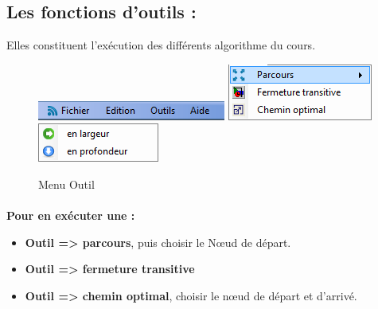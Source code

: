 \documentclass[11pt,twoside,a4paper]{article}
\begin{document}
\subsection{Les fonctions d’outils :}
Elles constituent l'exécution des différents algorithme du cours.

\begin{figure}[!h]
\begin{center}
\includegraphics{menu.png}
\includegraphics{outil.png}
\includegraphics{parcours.png}
\caption{Menu Outil}
\end{center}
\end{figure}
\paragraph{}

{\bf Pour en exécuter une :}
\begin{itemize}
\item \textbf{Outil => parcours}, puis choisir le Nœud de départ.
\item \textbf{Outil => fermeture transitive}
\item \textbf{Outil => chemin optimal}, choisir le nœud de départ et d’arrivé.
 \end{itemize}
\end{document}
